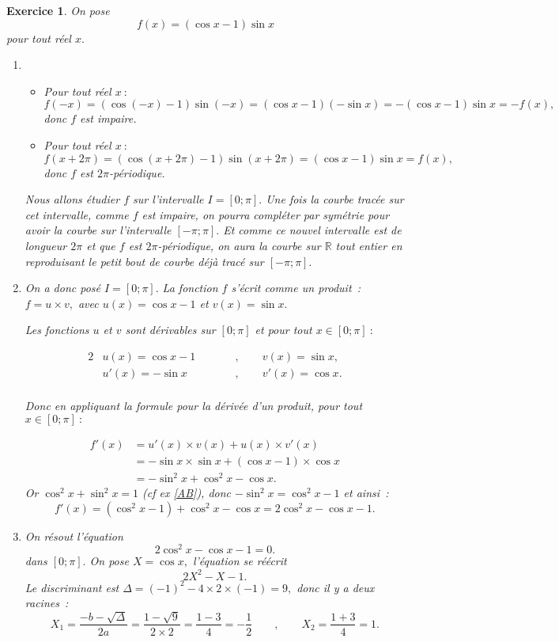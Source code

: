 \documentclass[10pt]{article}
\newtheorem{exo}{Exercice}
\begin{document}
\begin{exo}

On pose \[f(x)=\left(\cos x-1\right)\sin x\] pour tout réel $x.$

\begin{enumerate}
\item \begin{itemize}
\item[\textbullet] Pour tout réel $x~:$
\[f(-x)=\left(\cos (-x)-1\right)\sin (-x)=\left(\cos x-1\right)(-\sin x)=-(\cos x-1)\sin x=-f(x),\] donc $f$ est impaire.
\item[\textbullet]  Pour tout réel $x~:$
\[f(x+2\pi)=\left(\cos (x+2\pi)-1\right)\sin (x+2\pi)=\left(\cos x-1\right)\sin x=f(x),\]
donc $f$ est $2\pi$-périodique.
\end{itemize}

\medskip

Nous allons étudier $f$ sur l'intervalle $I=\left[0;\pi\right].$ Une fois la courbe tracée sur cet intervalle, comme $f$ est impaire, on pourra compléter par symétrie pour avoir la courbe sur l'intervalle $\left[-\pi;\pi\right].$ Et comme ce nouvel intervalle est de longueur $2\pi$ et que $f$ est $2\pi$-périodique, on aura la courbe sur $\mathbb{R}$ tout entier en reproduisant le petit bout de courbe déjà tracé sur $\left[-\pi;\pi\right].$

\item On a donc posé $I=\left[0;\pi\right].$ La fonction $f$ s'écrit comme un produit~: $f=u\times v,$ avec $u(x)=\cos x-1$ et $v(x)=\sin x.$

Les fonctions $u$ et $v$ sont dérivables sur $\left[0;\pi\right]$ et pour tout $x\in\left[0;\pi\right]~:$


\begin{alignat*}{2}
&u(x)=\cos x-1\qquad && , \qquad v(x)=\sin x,\\
&u'(x)=-\sin x \qquad && , \qquad v'(x)=\cos x.\\
\end{alignat*}





Donc en appliquant la formule pour la dérivée d'un produit, pour tout $x\in\left[0;\pi\right]~:$


\begin{align*}f'(x)&=u'(x)\times v(x)+u(x)\times v'(x)\\
&=-\sin x\times \sin x+(\cos x-1)\times \cos x\\
&=-\sin^2 x+\cos^2 x-\cos x.
\end{align*}
Or $\cos^2x+\sin^2x=1$ (cf ex \ref{AB}), donc $-\sin^2 x=\cos^2 x-1$ et ainsi~:
\[f'(x)=\left(\cos^2 x-1\right)+\cos^2 x-\cos x=2\cos^2 x-\cos x-1.\] 
\item On résout l'équation
\begin{equation}\label{A} 2\cos^2 x-\cos x-1=0.
\end{equation} dans $\left[0;\pi\right].$ On pose $X=\cos x,$ l'équation se réécrit
\[2X^2-X-1.\]
Le discriminant est $\Delta=(-1)^2-4\times 2\times (-1)=9,$ donc il y a deux racines~:
\[X_1=\frac{-b-\sqrt{\Delta}}{2a}=\frac{1-\sqrt{9}}{2\times 2}=\frac{1-3}{4}=-\frac{1}{2}\qquad ,\qquad X_2=\frac{1+3}{4}=1.\]


\end{enumerate}
\end{exo}
\end{document}
